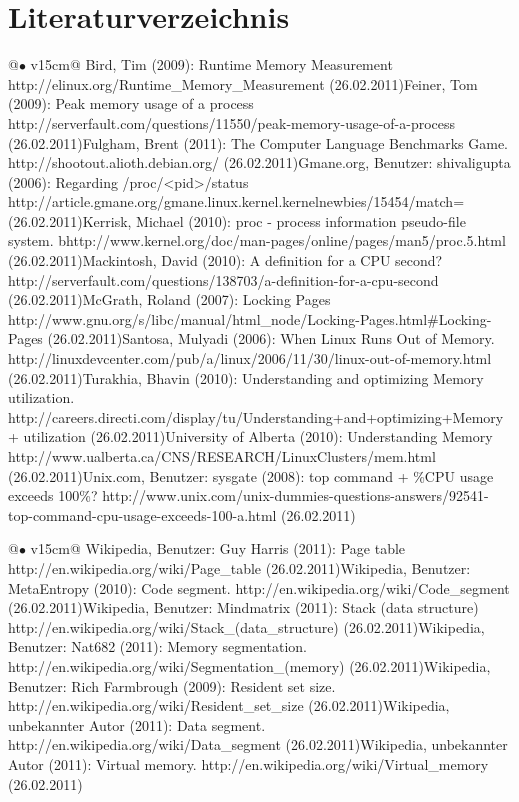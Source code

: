 \documentclass{fancydocument}
\begin{document}
\section{Literaturverzeichnis}
\noindent
\begin{tabularx}{\linewidth}{@{$\bullet$  }v{15cm}@{}}
Bird, Tim (2009): Runtime Memory Measurement
http://elinux.org/Runtime\_Memory\_Measurement (26.02.2011)\tabularnewline[3pt]
Feiner, Tom (2009): Peak memory usage of a process
http://serverfault.com/questions/11550/peak-memory-usage-of-a-process (26.02.2011)\tabularnewline[3pt]
Fulgham, Brent (2011): The Computer Language Benchmarks Game.
http://shootout.alioth.debian.org/ (26.02.2011)\tabularnewline[3pt]
Gmane.org, Benutzer: shivaligupta (2006): Regarding /proc/<pid>/status
http://article.gmane.org/gmane.linux.kernel.kernelnewbies/15454/match= (26.02.2011)\tabularnewline[3pt]
Kerrisk, Michael (2010): proc - process information pseudo-file system.
bhttp://www.kernel.org/doc/man-pages/online/pages/man5/proc.5.html (26.02.2011)\tabularnewline[3pt]
Mackintosh, David (2010): A definition for a CPU second?
http://serverfault.com/questions/138703/a-definition-for-a-cpu-second (26.02.2011)\tabularnewline[3pt]
McGrath, Roland (2007): Locking Pages
http://www.gnu.org/s/libc/manual/html\_node/Locking-Pages.html#Locking-Pages (26.02.2011)\tabularnewline[3pt]
Santosa, Mulyadi (2006): When Linux Runs Out of Memory.
http://linuxdevcenter.com/pub/a/linux/2006/11/30/linux-out-of-memory.html (26.02.2011)\tabularnewline[3pt]
Turakhia, Bhavin (2010): Understanding and optimizing Memory utilization.
http://careers.directi.com/display/tu/Understanding+and+optimizing+Memory+ utilization (26.02.2011)\tabularnewline[3pt]
University of Alberta (2010): Understanding Memory
http://www.ualberta.ca/CNS/RESEARCH/LinuxClusters/mem.html (26.02.2011)\tabularnewline[3pt]
Unix.com, Benutzer: sysgate (2008): top command + \%CPU usage exceeds 100\%?
http://www.unix.com/unix-dummies-questions-answers/92541-top-command-cpu-usage-exceeds-100-a.html (26.02.2011)\tabularnewline[3pt]
\end{tabularx}
\newpage
\noindent
\begin{tabularx}{\linewidth}{@{$\bullet$  }v{15cm}@{}}
Wikipedia, Benutzer: Guy Harris (2011): Page table
http://en.wikipedia.org/wiki/Page\_table (26.02.2011)\tabularnewline[3pt]
Wikipedia, Benutzer: MetaEntropy (2010): Code segment.
http://en.wikipedia.org/wiki/Code\_segment (26.02.2011)\tabularnewline[3pt]
Wikipedia, Benutzer: Mindmatrix (2011): Stack (data structure)
http://en.wikipedia.org/wiki/Stack\_(data\_structure) (26.02.2011)\tabularnewline[3pt]
Wikipedia, Benutzer: Nat682 (2011): Memory segmentation.
http://en.wikipedia.org/wiki/Segmentation\_(memory) (26.02.2011)\tabularnewline[3pt]
Wikipedia, Benutzer: Rich Farmbrough (2009): Resident set size.
http://en.wikipedia.org/wiki/Resident\_set\_size (26.02.2011)\tabularnewline[3pt]
Wikipedia, unbekannter Autor (2011): Data segment.
http://en.wikipedia.org/wiki/Data\_segment (26.02.2011)\tabularnewline[3pt]
Wikipedia, unbekannter Autor (2011): Virtual memory.
http://en.wikipedia.org/wiki/Virtual\_memory (26.02.2011)\tabularnewline[3pt]
\end{tabularx}
\end{document}

